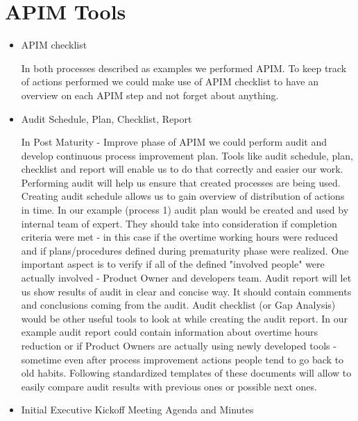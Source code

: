
\section{APIM Tools}

\begin{itemize}
\item APIM checklist

	In both processes described as examples we performed APIM. To keep track of actions performed we could make use of APIM checklist to have an overview on each APIM step and not forget about anything.

\item Audit Schedule, Plan, Checklist, Report

	In Post Maturity - Improve phase of APIM we could perform audit and develop continuous process improvement plan. Tools like audit schedule, plan, checklist and report will enable us to do that correctly and easier our work. Performing audit will help us ensure that created processes are being used. Creating audit schedule allows us to gain overview of distribution of actions in time. In our example (process 1) audit plan would be created and used by internal team of expert. They should take into consideration if completion criteria were met - in this case if the overtime working hours were reduced and if plans/procedures defined during prematurity phase were realized. One important aspect is to verify if all of the defined "involved people" were actually involved - Product Owner and developers team. Audit report will let us show results of audit in clear and concise way. It should contain comments and conclusions coming from the audit. Audit checklist (or Gap Analysis) would be other useful tools to look at while creating the audit report. In our example audit report could contain information about overtime hours reduction or if Product Owners are actually using newly developed tools - sometime even after process improvement actions people tend to go back to old habits. Following standardized templates of these documents will allow to easily compare audit results with previous ones or possible next ones.

\item Initial Executive Kickoff Meeting Agenda and Minutes


\end{itemize}
